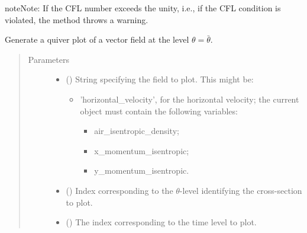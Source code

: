 \documentclass[letterpaper,10pt,english]{sphinxmanual}
\begin{document}
\begin{fulllineitems}
\begin{fulllineitems}
\begin{quote}
\begin{description}
\end{description}\end{quote}

\begin{sphinxadmonition}{note}{Note:}
If the CFL number exceeds the unity, i.e., if the CFL condition is violated, the method throws a warning.
\end{sphinxadmonition}

\end{fulllineitems}


\begin{fulllineitems}
\label{\detokenize{api:storages.state_isentropic.StateIsentropic.quiver_xy}}
Generate a quiver plot of a vector field at the level \(\theta = \bar{\theta}\).
\begin{quote}\begin{description}
\item[{Parameters}] \leavevmode\begin{itemize}
\item {} 
 () \textendash{} 
String specifying the field to plot. This might be:
\begin{itemize}
\item {} 
’horizontal\_velocity’, for the horizontal velocity; the current object must contain the following variables:
\begin{itemize}
\item {} 
air\_isentropic\_density;

\item {} 
x\_momentum\_isentropic;

\item {} 
y\_momentum\_isentropic.

\end{itemize}

\end{itemize}


\item {} 
 () \textendash{} Index corresponding to the \(\theta\)-level identifying the cross-section to plot.

\item {} 
 () \textendash{} The index corresponding to the time level to plot.


\end{itemize}
\end{description}
\end{quote}
\end{fulllineitems}
\end{fulllineitems}
\end{document}
